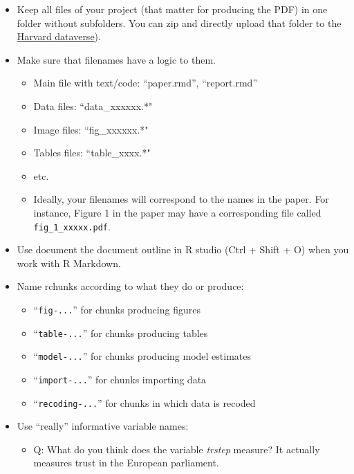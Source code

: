 \documentclass[12pt,]{article}
\providecommand{\tightlist}{%
  \setlength{\itemsep}{0pt}\setlength{\parskip}{0pt}}
\theoremstyle{definition}
\theoremstyle{definition}
\theoremstyle{definition}
\theoremstyle{remark}
\begin{document}
\begin{itemize}
\tightlist
\item
  Keep all files of your project (that matter for producing the PDF) in
  one folder without subfolders. You can zip and directly upload that
  folder to the \href{https://dataverse.harvard.edu/}{Harvard
  dataverse}).
\item
  Make sure that filenames have a logic to them.

  \begin{itemize}
  \tightlist
  \item
    Main file with text/code: ``paper.rmd'', ``report.rmd''
  \item
    Data files: ``data\_xxxxxx.*"
  \item
    Image files: ``fig\_xxxxxx.*"
  \item
    Tables files: ``table\_xxxx.*"
  \item
    etc.
  \item
    Ideally, your filenames will correspond to the names in the paper.
    For instance, Figure 1 in the paper may have a corresponding file
    called \texttt{fig\_1\_xxxxx.pdf}.
  \end{itemize}
\item
  Use document the document outline in R studio (Ctrl + Shift + O) when
  you work with R Markdown.
\item
  Name rchunks according to what they do or produce:

  \begin{itemize}
  \tightlist
  \item
    ``\texttt{fig-...}'' for chunks producing figures
  \item
    ``\texttt{table-...}'' for chunks producing tables
  \item
    ``\texttt{model-...}'' for chunks producing model estimates
  \item
    ``\texttt{import-...}'' for chunks importing data
  \item
    ``\texttt{recoding-...}'' for chunks in which data is recoded
  \end{itemize}
\item
  Use ``really'' informative variable names:

  \begin{itemize}
  \tightlist
  \item
    Q: What do you think does the variable \emph{trstep} measure? It
    actually measures trust in the European parliament.


\end{itemize}
\end{itemize}
\end{document}
